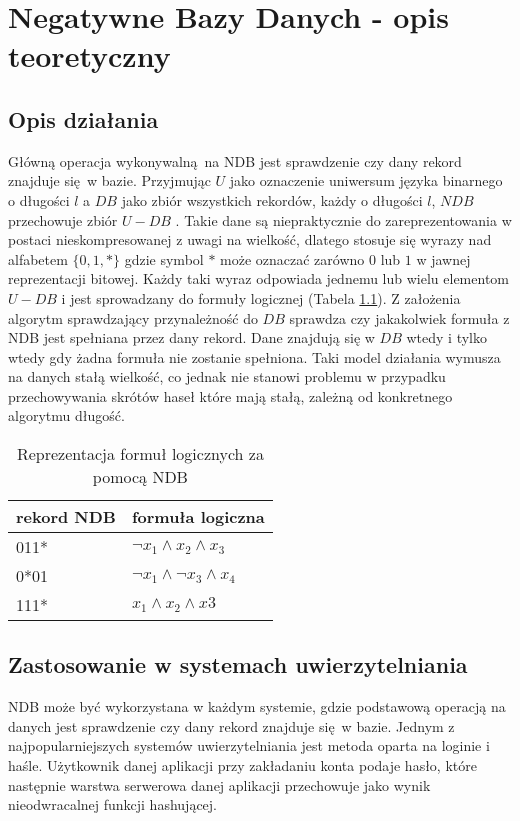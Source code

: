 \chapter{Negatywne Bazy Danych - opis teoretyczny}
\section{Opis działania}
Główną operacja wykonywalną na NDB jest sprawdzenie czy dany rekord znajduje się w bazie. Przyjmując $U$ 
jako oznaczenie uniwersum języka binarnego o długości $l$ a $DB$ jako zbiór wszystkich rekordów, każdy o długości $l$,
$NDB$ przechowuje zbiór $U - DB$ \cite{NRI-Esponda}. Takie dane są niepraktycznie do zareprezentowania w postaci nieskompresowanej z uwagi na wielkość, dlatego
stosuje się wyrazy nad alfabetem $\{0,1,*\}$ gdzie symbol $*$ może oznaczać zarówno $0$ lub $1$ w jawnej reprezentacji bitowej.
Każdy taki wyraz odpowiada jednemu lub wielu elementom $U - DB$ i jest sprowadzany do formuły logicznej (Tabela \ref{Tbl:NDB-logform}).
Z założenia algorytm sprawdzający przynależność do $DB$ sprawdza czy jakakolwiek formuła z NDB jest spełniana przez dany rekord. 
Dane znajdują się w $DB$ wtedy i tylko wtedy gdy żadna formuła nie zostanie spełniona. Taki model działania wymusza na danych stałą wielkość,
co jednak nie stanowi problemu w przypadku przechowywania skrótów haseł które mają stałą, zależną od konkretnego algorytmu długość.

\begin{table}[h]
    \caption{Reprezentacja formuł logicznych za pomocą NDB}
    \centering
    \label{Tbl:NDB-logform}
    \begin{tabular}{|l|l|}
        \hline
        rekord NDB & formuła logiczna                       \\ \hline
        011*       & $\neg{x_1} \land x_2 \land x_3$        \\ \hline
        0*01       & $\neg{x_1} \land \neg{x_3} \land x_4 $ \\ \hline
        111*       & $x_1 \land x_2 \land x3$               \\ \hline
    \end{tabular}
\end{table}

\section{Zastosowanie w systemach uwierzytelniania}
NDB może być wykorzystana w każdym systemie, gdzie podstawową operacją na danych jest sprawdzenie czy
dany rekord znajduje się w bazie. Jednym z najpopularniejszych systemów uwierzytelniania jest metoda oparta na loginie i haśle.
Użytkownik danej aplikacji przy zakładaniu konta podaje hasło, które następnie warstwa serwerowa danej aplikacji przechowuje jako wynik nieodwracalnej funkcji hashującej.

